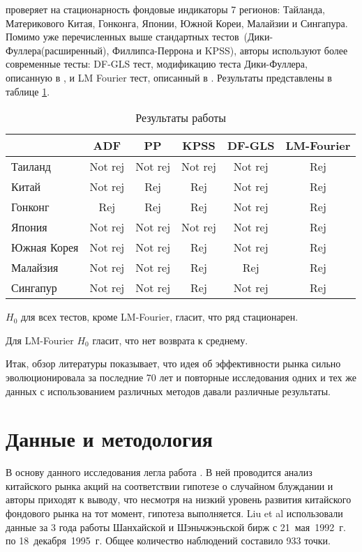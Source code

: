 \documentclass[a4paper,12pt]{article}
\begin{document}
\cite{Wang2015} проверяет на стационарность фондовые индикаторы 7 регионов: Тайланда, Материкового Китая, Гонконга, Японии, Южной Кореи, Малайзии и Сингапура. Помимо уже перечисленных выше стандартных тестов~(Дики-Фуллера(расширенный), Филлипса-Перрона и KPSS), авторы используют более современные тесты: DF-GLS тест, модификацию теста Дики-Фуллера, описанную в \cite{Elliot1996}, и LM Fourier тест, описанный в \cite{Enders2012}. Результаты представлены в таблице \ref{tab:wang}.

\begin{table}[]
\centering
\caption{Результаты работы \cite{Wang2015}}
\label{tab:wang}
\begin{tabular}{|l|c|c|c|c|c|}
\hline
 & ADF & PP & KPSS & DF-GLS & LM-Fourier \\ \hline
Таиланд & Not rej & Not rej & Not rej & Not rej & Rej \\ \hline
Китай & Not rej & Rej & Rej & Not rej & Rej \\ \hline
Гонконг & Rej & Rej & Rej & Not rej & Rej \\ \hline
Япония & Not rej & Not rej & Not rej & Not rej & Rej \\ \hline
Южная Корея & Not rej & Not rej & Rej & Not rej & Rej \\ \hline
Малайзия & Not rej & Not rej & Rej & Rej & Rej \\ \hline
Сингапур & Not rej & Not rej & Rej & Not rej & Rej \\ \hline
\end{tabular}

{\raggedright \par $H_0$ для всех тестов, кроме LM-Fourier, гласит, что ряд стационарен.}

{\raggedright \par Для LM-Fourier $H_0$ гласит, что нет возврата к среднему.}
\end{table}

Итак, обзор литературы показывает, что идея об эффективности рынка сильно эволюционировала за последние 70 лет и повторные исследования одних и тех же данных с использованием различных методов давали различные результаты.

\newpage
\section{Данные и методология}\label{sec:meth}

В основу данного исследования легла работа \cite{Liu1997}. В ней проводится анализ китайского рынка акций на соответствии гипотезе о случайном блуждании и авторы приходят к выводу, что несмотря на низкий уровень развития китайского фондового рынка на тот момент, гипотеза выполняется. Liu et al использовали данные за 3 года работы Шанхайской и Шэньчжэньской бирж с 21~мая~1992~г. по 18~декабря~1995~г. Общее количество наблюдений составило 933 точки.
\end{document}
